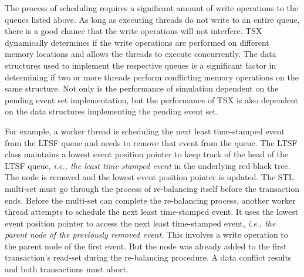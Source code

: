 \documentclass[11pt]{book}
\begin{document}
The process of scheduling requires a significant amount of write operations to the queues
listed above.  As long as executing threads do not write to an entire queue, there is a
good chance that the write operations will not interfere.  TSX dynamically determines if
the write operations are performed on different memory locations and allows the threads to
execute concurrently.  The data structures used to implement the respective queues is a
significant factor in determining if two or more threads perform conflicting memory
operations on the same structure.  Not only is the performance of simulation dependent on
the pending event set implementation, but the performance of TSX is also dependent on the
data structures implementing the pending event set.

For example, a worker thread is scheduling the next least time-stamped event from the LTSF
queue and needs to remove that event from the queue.  The LTSF class maintains
a lowest event position pointer to keep track of the head of the LTSF queue,
\emph{i.e., the least time-stamped event} in the underlying red-black tree. The
node is removed and the lowest event position pointer is updated.  The STL
multi-set must go through the process of re-balancing itself before the transaction ends.
Before the multi-set can complete the re-balancing process, another worker thread attempts
to schedule the next least time-stamped event. It uses the lowest event position
pointer to access the next least time-stamped event, \emph{i.e., the parent
node of the previously removed event}.  This involves a write operation to the
parent node of the first event.  But the node was already added to the first
transaction's read-set during the re-balancing procedure.  A data conflict
results and both transactions must abort.
\end{document}
